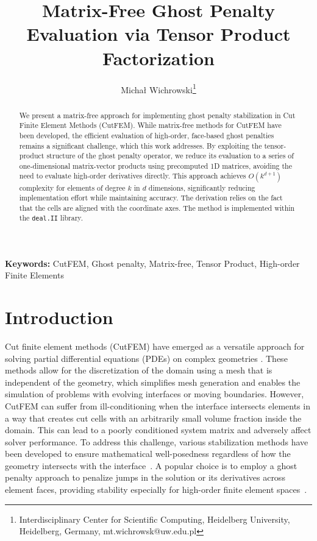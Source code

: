 \documentclass[11pt,a4paper]{article}
\title{Matrix-Free Ghost Penalty Evaluation via Tensor Product Factorization}
\author{Michał Wichrowski\footnote{ Interdisciplinary Center for Scientific Computing,
        Heidelberg University,
        Heidelberg, Germany, mt.wichrowsk@uw.edu.pl} }
\date{}
\begin{document}
\maketitle

\begin{abstract}
    We present a matrix-free approach for implementing ghost penalty stabilization in Cut Finite Element Methods
    (CutFEM). While matrix-free methods for CutFEM have been developed, the efficient evaluation of
    high-order, face-based ghost penalties remains a significant challenge, which this work addresses. By
    exploiting the
    tensor-product structure of the ghost penalty operator, we reduce its evaluation to a
    series of one-dimensional matrix-vector products using precomputed 1D matrices, avoiding the need to evaluate
    high-order derivatives directly. This approach achieves $O(k^{d+1})$ complexity for elements of degree $k$ in $d$
    dimensions, significantly reducing implementation effort while maintaining accuracy.
    The derivation relies on the fact that the cells are aligned with the coordinate axes.
    The method is implemented within the \texttt{deal.II} library.
\end{abstract}

\textbf{Keywords:}  CutFEM, Ghost penalty, Matrix-free, Tensor Product, High-order Finite Elements

\section{Introduction}
Cut finite element methods (CutFEM) have emerged as a versatile approach for solving partial differential equations
(PDEs) on complex geometries \cite{burman2015cutfem, burman2014fictitious, burman2016full, burman2022cutfem,
    cerroni2019numerical}. These methods allow for the discretization of the domain using a mesh that is independent of the
geometry, which simplifies mesh generation and enables the simulation of problems with evolving interfaces or moving
boundaries. However, CutFEM can suffer from ill-conditioning when the interface intersects elements in a way that
creates cut cells with an arbitrarily small volume fraction inside the domain. This can lead to a poorly conditioned
system matrix and adversely affect solver performance. To address this challenge, various stabilization methods have
been developed to ensure mathematical well-posedness regardless of how the geometry intersects with the
interface~\cite{burman2010ghost, badia2022linking}. A popular choice is to employ a ghost penalty approach to penalize
jumps in the solution or its derivatives across element faces, providing stability especially for high-order finite
element spaces~\cite{larson2020stabilization, hansbo2017cut, claus2019cutfem}.
\end{document}
